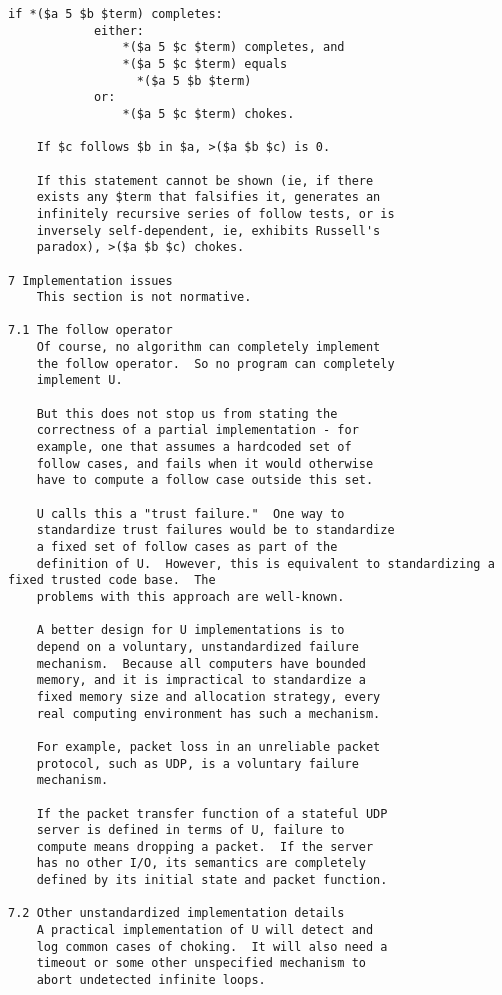 \documentclass[twoside]{article}
\begin{document}
\begin{lstlisting}[label=lst:u,caption={\texttt{U}, 31 January 2006.  The earliest extant patriarch of the Nock family.},style=listingcode]
        if *($a 5 $b $term) completes:
            either:
                *($a 5 $c $term) completes, and
                *($a 5 $c $term) equals
                  *($a 5 $b $term)
            or:
                *($a 5 $c $term) chokes.

    If $c follows $b in $a, >($a $b $c) is 0.

    If this statement cannot be shown (ie, if there
    exists any $term that falsifies it, generates an
    infinitely recursive series of follow tests, or is
    inversely self-dependent, ie, exhibits Russell's
    paradox), >($a $b $c) chokes.

7 Implementation issues
    This section is not normative.

7.1 The follow operator
    Of course, no algorithm can completely implement
    the follow operator.  So no program can completely
    implement U.

    But this does not stop us from stating the
    correctness of a partial implementation - for
    example, one that assumes a hardcoded set of
    follow cases, and fails when it would otherwise
    have to compute a follow case outside this set.

    U calls this a "trust failure."  One way to
    standardize trust failures would be to standardize
    a fixed set of follow cases as part of the
    definition of U.  However, this is equivalent to standardizing a fixed trusted code base.  The
    problems with this approach are well-known.

    A better design for U implementations is to
    depend on a voluntary, unstandardized failure
    mechanism.  Because all computers have bounded
    memory, and it is impractical to standardize a
    fixed memory size and allocation strategy, every
    real computing environment has such a mechanism.

    For example, packet loss in an unreliable packet
    protocol, such as UDP, is a voluntary failure
    mechanism.

    If the packet transfer function of a stateful UDP
    server is defined in terms of U, failure to
    compute means dropping a packet.  If the server
    has no other I/O, its semantics are completely
    defined by its initial state and packet function.

7.2 Other unstandardized implementation details
    A practical implementation of U will detect and
    log common cases of choking.  It will also need a
    timeout or some other unspecified mechanism to
    abort undetected infinite loops.


\end{lstlisting}
\end{document}
